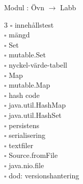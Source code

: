 
    Modul : Övn  $\rightarrow$ Labb 
    \begin{multicols}{3}\SlideFontTiny
    $\square$ innehållstest \\
$\square$ mängd \\
$\square$ Set \\
$\square$ mutable.Set \\
$\square$ nyckel-värde-tabell \\
$\square$ Map \\
$\square$ mutable.Map \\
$\square$ hash code \\
$\square$ java.util.HashMap \\
$\square$ java.util.HashSet \\
$\square$ persistens \\
$\square$ serialisering \\
$\square$ textfiler \\
$\square$ Source.fromFile \\
$\square$ java.nio.file \\
$\square$ dod: versionshantering \\
    \end{multicols}
    